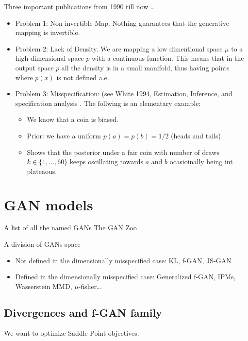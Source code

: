 \documentclass[b5paper]{report}
\begin{document}
Three important publications from 1990 till now \dots

\begin{itemize}
  \item Problem 1: Non-invertible Map. Nothing guarantees that the generative
    mapping is invertible.
  \item Problem 2: Lack of Density. We are mapping a low dimentional space
    $\mu$ to a high dimensional space $p$ with a continuous function. This
    means that in the output space $p$ all the density is in a small manifold,
    thus having points where $p(x)$ is not defined a.e.
  \item Problem 3: Misspecification: (see White 1994, Estimation, Inference,
      and specification analysis \cite{white1996estimation}. The follwing is an
      elementary example:
      \begin{itemize}
        \item We know that a coin is biased.
        \item Prior: we have a uniform $p(a) = p(b) = 1/2$ (heads and tails)
        \item Shows that the posterior under a fair coin with number of draws
          $k \in \{1,\dots,60\}$ keeps oscillating towards $a$ and  $b$
          ocasioinally being int plateaous.
      \end{itemize}
\end{itemize}

\section{GAN models}

A list of all the named GANs
\href{https://github.com/hindupuravinash/the-gan-zoo}{The GAN Zoo}

A division of GANs space

\begin{itemize}
  \item Not defined in the dimensionally misspecified case: KL, f-GAN, JS-GAN
  \item Defined in the dimensionally misspecified case: Generalized f-GAN,
    IPMs, Wasserstein MMD, $\mu$-fisher\dots
\end{itemize}

\subsection{Divergences and f-GAN family}

We want to optimize Saddle Point objectives.
\end{document}
